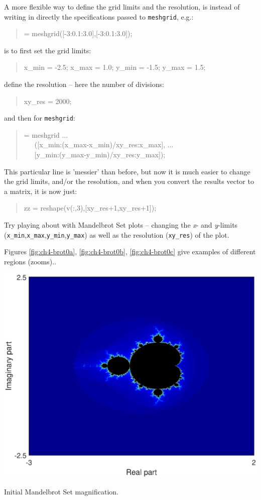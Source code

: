 \documentclass{tufte-book} %
\newenvironment{docspec}{\begin{quotation}\ttfamily\parskip0pt\parindent0pt\ignorespaces}{\end{quotation}}
\begin{document}
\noindent A more flexible way to define the grid limits and the resolution, is instead of writing in directly the specifications passed to \texttt{meshgrid}, e.g.:
\begin{docspec}
[xx, yy] = meshgrid([-3:0.1:3.0],[-3:0.1:3.0]);
\end{docspec}
is to first set the grid limits:
\begin{docspec}
x\_min = -2.5;
x\_max = 1.0;
y\_min = -1.5;
y\_max = 1.5;
\end{docspec}
define the resolution -- here the number of divisions:
\begin{docspec}
xy\_res = 2000;
\end{docspec}
and then for \texttt{meshgrid}:
\begin{docspec}
[xx, yy] = meshgrid ...
\\ \ \ \ ([x\_min:(x\_max-x\_min)/xy\_res:x\_max], ...
\\ \ \ \ [y\_min:(y\_max-y\_min)/xy\_res:y\_max]);
\end{docspec}
This particular line is 'messier' than before, but now it is much easier to change the grid limits, and/or the resolution, and when you convert the results vector to a matrix, it is now just:
\begin{docspec}
zz = reshape(v(:,3),[xy\_res+1,xy\_res+1]);
\end{docspec}

Try playing about with Mandelbrot Set plots -- changing the \textit{x}- and \textit{y}-limits (\texttt{x\_min},\texttt{x\_max},\texttt{y\_min},\texttt{y\_max}) as well as the resolution (\texttt{xy\_res}) of the plot.

Figures \ref{fig:ch4-brot0a}, \ref{fig:ch4-brot0b}, \ref{fig:ch4-brot0c} give examples of different regions (zooms)..

\begin{marginfigure}[-7.0in]
\includegraphics[width=\linewidth]{ch4-brot0a.eps}
\caption{Initial Mandelbrot Set magnification.}
\label{fig:ch4-brot0a}
\end{marginfigure}
\end{document}

